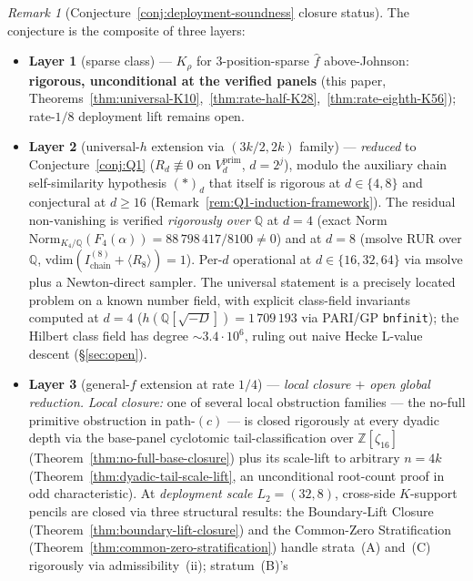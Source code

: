 \documentclass[11pt]{article}
\theoremstyle{definition}
\theoremstyle{remark}
\newtheorem{remark}[theorem]{Remark}
\begin{document}
\begin{remark}[Conjecture~\ref{conj:deployment-soundness} closure status]
\label{rem:deployment-soundness-status}
The conjecture is the composite of three layers:
\begin{itemize}[nosep,leftmargin=*]
\item \textbf{Layer 1} (sparse class)
--- $K_\rho$ for $3$-position-sparse $\hat f$ above-Johnson:
\textbf{rigorous, unconditional at the verified panels} (this paper,
Theorems~\ref{thm:universal-K10},~\ref{thm:rate-half-K28},~\ref{thm:rate-eighth-K56});
rate-$1/8$ deployment lift remains open.
\item \textbf{Layer 2} (universal-$h$ extension via $(3k/2, 2k)$
family) --- \emph{reduced} to Conjecture~\ref{conj:Q1}
($R_d \not\equiv 0$ on $V_d^{\mathrm{prim}}$, $d = 2^j$), modulo the
auxiliary chain self-similarity hypothesis $(\ast)_d$ that itself is
rigorous at $d \in \{4, 8\}$ and conjectural at $d \geq 16$
(Remark~\ref{rem:Q1-induction-framework}). The residual non-vanishing
is verified \emph{rigorously over $\mathbb{Q}$} at $d = 4$ (exact Norm
$\mathrm{Norm}_{K_4/\mathbb{Q}}(F_4(\alpha))
= 88\,798\,417/8100 \neq 0$) and at $d = 8$ (msolve RUR over
$\mathbb{Q}$, $\mathrm{vdim}(I_{\mathrm{chain}}^{(8)} +
\langle R_8 \rangle) = 1$).
Per-$d$ operational at $d \in \{16, 32, 64\}$ via msolve plus a
Newton-direct sampler. The universal statement is a precisely located
problem on a known number field, with explicit class-field invariants
computed at $d = 4$
($h(\mathbb{Q}[\sqrt{-D}]) = 1\,709\,193$ via PARI/GP
\texttt{bnfinit}); the Hilbert class field has degree
${\sim} 3.4 \cdot 10^{6}$, ruling out naive Hecke L-value descent
(\S\ref{sec:open}).
\item \textbf{Layer 3} (general-$f$ extension at rate $1/4$) ---
\emph{local closure $+$ open global reduction.}
\emph{Local closure:} one of several local obstruction families ---
the no-full primitive obstruction in path-$(c)$ --- is closed
rigorously at every dyadic depth via the base-panel cyclotomic
tail-classification over $\mathbb{Z}[\zeta_{16}]$
(Theorem~\ref{thm:no-full-base-closure}) plus its scale-lift to
arbitrary $n = 4k$ (Theorem~\ref{thm:dyadic-tail-scale-lift}, an
unconditional root-count proof in odd characteristic). At
\emph{deployment scale $L_2 = (32, 8)$}, cross-side $K$-support pencils
are closed via three structural results: the Boundary-Lift Closure
(Theorem~\ref{thm:boundary-lift-closure}) and the Common-Zero
Stratification (Theorem~\ref{thm:common-zero-stratification}) handle
strata~(A) and~(C) rigorously via admissibility~(ii); stratum~(B)'s

\end{itemize}
\end{remark}
\end{document}
